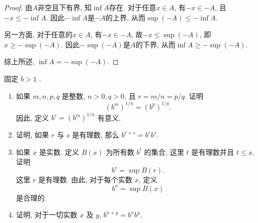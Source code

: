 \documentclass{article}
\begin{document}
\begin{proof}
由$ A $非空且下有界, 知$ \inf A $存在. 对于任意$ x\in A $, 有$ -x\in -A $, 且$ -x\le -\inf A $. 因此$ -\inf A $是$ -A $的上界, 从而$ \sup(-A)\le -\inf A $. \par
另一方面, 对于任意的$ x\in A $, 有$ -x\in -A $, 故$ -x\le \sup(-A) $, 即$ x\ge-\sup(-A) $. 因此$ -\sup(-A) $是$ A $的下界, 从而$ \inf A\ge -\sup(-A) $. \par
综上所述, $ \inf A=-\sup(-A) $.
\end{proof}

\begin{problem}[1-6]
固定 $ b>1 $ .
\begin{enumerate}[label=(\alph*)]
\item 如果 \( m, n, p, q \) 是整数, \( n > 0, q > 0 \), 且 \( r = m/n = p/q \). 证明  
\[(b^m)^{1/n} = (b^p)^{1/q}.\]
因此, 定义 \( b^r = (b^m)^{1/n} \) 有意义.
\item 证明, 如果 \( r \) 与 \( s \) 是有理数, 那么 \( b^{r+s} = b^r b^s \). 
\item 如果 \( x \) 是实数. 定义 \( B(x) \) 为所有数 \( b^t \) 的集合, 这里 \( t \) 是有理数并且 \( t \leq x \). 
证明  
\[b^r = \sup B(r).\]
这里 \( r \) 是有理数. 由此, 对于每个实数 \( x \), 定义  
\[b^x = \sup B(x)\]
是合理的. 
\item 证明, 对于一切实数 \( x \) 及 \( y \), \( b^{x+y} = b^x b^y \). 
\end{enumerate}
\end{problem}
\end{document}
